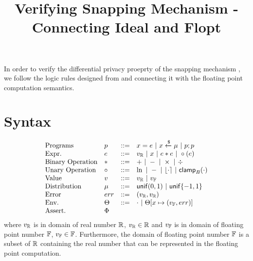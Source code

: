\documentclass[a4paper,11pt]{article}
\begin{document}
\title{Verifying Snapping Mechanism - Connecting Ideal and Flopt}
\author{}

\date{}

\maketitle
In order to verify the differential privacy proeprty of
the snapping mechanism \cite{mironov2012significance},
we follow the logic rules designed from
\cite{barthe2016proving} and connecting 
it with the floating point computation semantics.
\section{Syntax}
\[\begin{array}{llll}
\mbox{Programs} & \prog & ::= & 
     \varx = \expr ~|~ \varx \samplel \edistr
	~|~ \prog ; \prog \\

\mbox{Expr.} & \expr & ::= & \rval 
	~|~ \varx  ~|~ \expr \bop \expr
	~|~ \uop (\expr) \\
%
\mbox{Binary Operation} & \bop & ::= & + ~|~ - ~|~ \times ~|~ \div \\
%
\mbox{Unary Operation} & \uop & ::= & \ln ~|~ - ~|~ \round{\cdot} 
	~|~ \clamp_B(\cdot) \\
%
\mbox{Value} & \valv & ::= & \rval ~|~  \fval \\
%
\mbox{Distribution} & \edistr & ::= & \uniform(0, 1) 
%
	~|~ \uniform\{-1, 1\}\\ 
%
\mbox{Error} & \err & ::= & (\rval, \rval) \\
%
\mbox{Env.} & \trsenv & ::= & \cdot ~|~ \trsenv[x \mapsto (\fval, \err)] \\
%
\mbox{Assert.} & \Phi &  & 
\end{array}
\]
where $v_{\mathbb{R}}$ is in domain of real number $\mathbb{R}$, $v_{\mathbb{R}} \in \mathbb{R}$ and $v_{\mathbb{F}}$ is in domain of floating point number $\mathbb{F}$, $v_{\mathbb{F}} \in \mathbb{F}$. Furthermore, the domain of floating point number $\mathbb{F}$ is a subset of $\mathbb{R}$ containing the real number that can be represented in the floating point computation.
\end{document}
